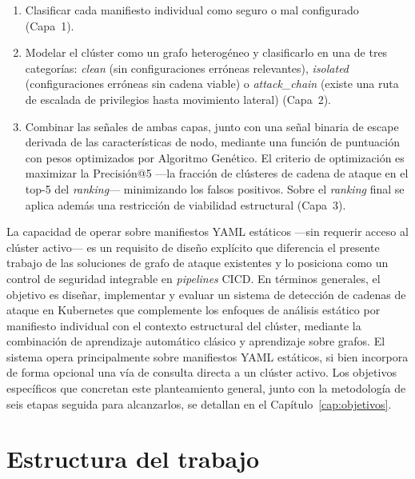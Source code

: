 \begin{enumerate}
  \item Clasificar cada manifiesto individual como seguro o mal configurado (Capa~1).
  \item Modelar el clúster como un grafo heterogéneo y clasificarlo en una de tres
        categorías: \textit{clean} (sin configuraciones erróneas relevantes),
        \textit{isolated} (configuraciones erróneas sin cadena viable) o \textit{attack\_chain}
        (existe una ruta de escalada de privilegios hasta movimiento lateral) (Capa~2).
  \item Combinar las señales de ambas capas, junto con una señal binaria de escape
        derivada de las características de nodo, mediante una función de puntuación
        con pesos optimizados por Algoritmo Genético. El criterio de optimización es
        maximizar la Precisión@5 —la fracción de clústeres de cadena de ataque en el
        top-5 del \textit{ranking}— minimizando los falsos positivos. Sobre el
        \textit{ranking} final se aplica además una restricción de viabilidad
        estructural (Capa~3).
\end{enumerate}

La capacidad de operar sobre manifiestos \acs{YAML} estáticos —sin requerir acceso al
clúster activo— es un requisito de diseño explícito que diferencia el presente trabajo
de las soluciones de grafo de ataque existentes y lo posiciona como un control de
seguridad integrable en \textit{pipelines} \acs{CICD}. En términos generales, el
objetivo es diseñar, implementar y evaluar un sistema de detección de cadenas de
ataque en Kubernetes que complemente los enfoques de análisis estático por
manifiesto individual con el contexto estructural del clúster, mediante la
combinación de aprendizaje automático clásico y aprendizaje sobre grafos. El
sistema opera principalmente sobre manifiestos \acs{YAML} estáticos, si bien
incorpora de forma opcional una vía de consulta directa a un clúster activo. Los
objetivos específicos que
concretan este planteamiento general, junto con la metodología de seis etapas
seguida para alcanzarlos, se detallan en el Capítulo~\ref{cap:objetivos}.

\section{Estructura del trabajo}

